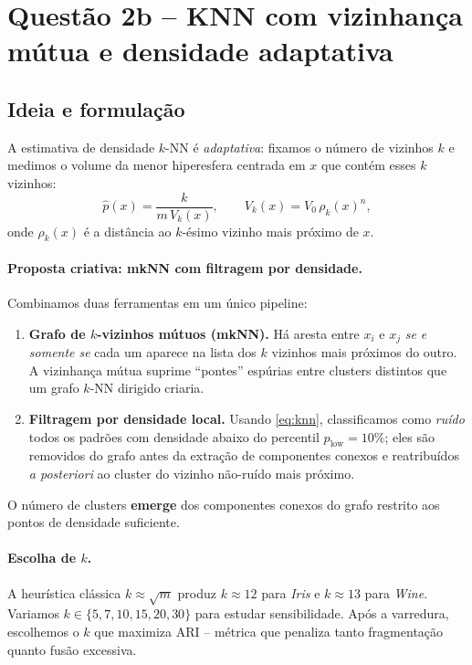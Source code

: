 \documentclass[11pt,a4paper]{article}
\newcommand{\hatp}{\hat p}
\begin{document}
\section{Questão 2b -- KNN com vizinhança mútua e densidade adaptativa}
\subsection{Ideia e formulação}
A estimativa de densidade $k$-NN é \emph{adaptativa}: fixamos o número de vizinhos $k$ e medimos o volume da menor hiperesfera centrada em $x$ que contém esses $k$ vizinhos:
\begin{equation}
  \hatp(x) = \frac{k}{m\, V_k(x)}, \qquad V_k(x) = V_0 \,\rho_k(x)^n,
  \label{eq:knn}
\end{equation}
onde $\rho_k(x)$ é a distância ao $k$-ésimo vizinho mais próximo de $x$.

\paragraph{Proposta criativa: mkNN com filtragem por densidade.}
Combinamos duas ferramentas em um único pipeline:
\begin{enumerate}[leftmargin=1.7em]
\item \textbf{Grafo de $k$-vizinhos mútuos (mkNN).} Há aresta entre $x_i$ e $x_j$ \emph{se e somente se} cada um aparece na lista dos $k$ vizinhos mais próximos do outro.
A vizinhança mútua suprime ``pontes'' espúrias entre clusters distintos que um grafo $k$-NN dirigido criaria.
\item \textbf{Filtragem por densidade local.} Usando \eqref{eq:knn}, classificamos como \emph{ruído} todos os padrões com densidade abaixo do percentil $p_{\text{low}} = 10\%$; eles são removidos do grafo antes da extração de componentes conexos e reatribuídos \emph{a posteriori} ao cluster do vizinho não-ruído mais próximo.
\end{enumerate}
O número de clusters \textbf{emerge} dos componentes conexos do grafo restrito aos pontos de densidade suficiente.

\paragraph{Escolha de $k$.}
A heurística clássica $k \approx \sqrt{m}$ produz $k \approx 12$ para \emph{Iris} e $k \approx 13$ para \emph{Wine}. Variamos $k \in \{5, 7, 10, 15, 20, 30\}$ para estudar sensibilidade. Após a varredura, escolhemos o $k$ que maximiza ARI -- métrica que penaliza tanto fragmentação quanto fusão excessiva.
\end{document}
